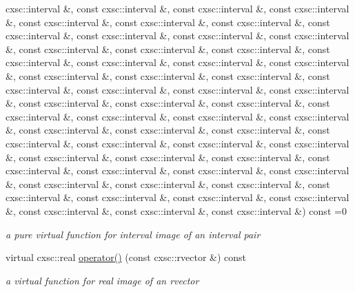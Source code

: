\begin{DoxyCompactItemize}
cxsc\-::interval \&, const cxsc\-::interval \&, const cxsc\-::interval \&, const cxsc\-::interval \&, const cxsc\-::interval \&, const cxsc\-::interval \&, const cxsc\-::interval \&, const cxsc\-::interval \&, const cxsc\-::interval \&, const cxsc\-::interval \&, const cxsc\-::interval \&, const cxsc\-::interval \&, const cxsc\-::interval \&, const cxsc\-::interval \&, const cxsc\-::interval \&, const cxsc\-::interval \&, const cxsc\-::interval \&, const cxsc\-::interval \&, const cxsc\-::interval \&, const cxsc\-::interval \&, const cxsc\-::interval \&, const cxsc\-::interval \&, const cxsc\-::interval \&, const cxsc\-::interval \&, const cxsc\-::interval \&, const cxsc\-::interval \&, const cxsc\-::interval \&, const cxsc\-::interval \&, const cxsc\-::interval \&, const cxsc\-::interval \&, const cxsc\-::interval \&, const cxsc\-::interval \&, const cxsc\-::interval \&, const cxsc\-::interval \&, const cxsc\-::interval \&, const cxsc\-::interval \&, const cxsc\-::interval \&, const cxsc\-::interval \&, const cxsc\-::interval \&, const cxsc\-::interval \&, const cxsc\-::interval \&, const cxsc\-::interval \&, const cxsc\-::interval \&, const cxsc\-::interval \&, const cxsc\-::interval \&, const cxsc\-::interval \&, const cxsc\-::interval \&, const cxsc\-::interval \&, const cxsc\-::interval \&, const cxsc\-::interval \&, const cxsc\-::interval \&, const cxsc\-::interval \&, const cxsc\-::interval \&, const cxsc\-::interval \&, const cxsc\-::interval \&, const cxsc\-::interval \&) const =0
\begin{DoxyCompactList}\small\item\em a pure virtual function for interval image of an interval pair \end{DoxyCompactList}\item 
virtual cxsc\-::real \hyperlink{classsubpavings_1_1MappedFobj1000D_aa99416ed43da9c31039f8f9d3b390d1e}{operator()} (const cxsc\-::rvector \&) const 
\begin{DoxyCompactList}\small\item\em a virtual function for real image of an rvector \end{DoxyCompactList}\item 

\end{DoxyCompactItemize}
